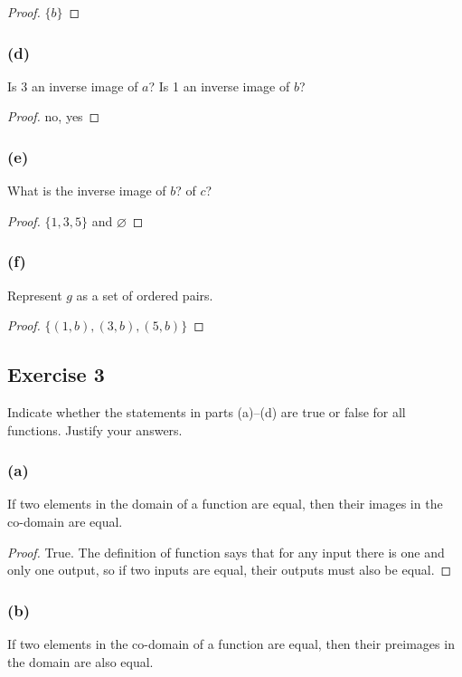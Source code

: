 \documentclass[14pt]{extarticle}
\newcommand{\es}{\varnothing}
\begin{document}
\begin{proof}
    \(\{b\}\)
\end{proof}

\subsubsection{(d)}
Is 3 an inverse image of $a$? Is 1 an inverse image of $b$?

\begin{proof}
    no, yes
\end{proof}

\subsubsection{(e)}
What is the inverse image of $b$? of $c$?

\begin{proof}
    \(\{1,3,5\}\) and $\es$
\end{proof}

\subsubsection{(f)}
Represent $g$ as a set of ordered pairs.

\begin{proof}
    \(\{(1,b),(3,b),(5,b)\}\)
\end{proof}


\subsection{Exercise 3}
Indicate whether the statements in parts (a)–(d) are true or false for all functions. Justify your answers.

\subsubsection{(a)}
If two elements in the domain of a function are equal, then their images in the co-domain are equal.

\begin{proof}
    True. The definition of function says that for any input there is one and only one output, so if two inputs are
    equal, their outputs must also be equal.
\end{proof}

\subsubsection{(b)}
If two elements in the co-domain of a function are equal, then their preimages in the domain are also equal.
\end{document}
